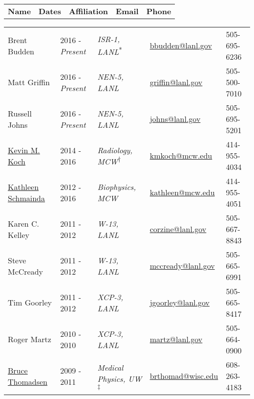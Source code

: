 %


\begin{center}
\begin{minipage}{\textwidth}
\begin{tabular}{p{3.2cm}p{2.2cm}p{3.7cm}p{5.0cm}p{2.4cm}}
\textbf{Name} & \textbf{Dates}  & \textbf{Affiliation} & \textbf{Email} & \textbf{Phone} \\
\end{tabular}
\end{minipage}
\end{center}


\begin{center}
\begin{minipage}{\textwidth}
\begin{tabular}{p{3.2cm}p{2.2cm}p{3.7cm}p{5.0cm}p{2.4cm}}
Brent Budden & 2016 - \emph{Present} & \textit{ISR-1, LANL}\textsuperscript{*} &  \href{mailto:bbudden@lanl.gov}{bbudden@lanl.gov} & 505-695-6236 \\
Matt Griffin & 2016 - \emph{Present} & \textit{NEN-5, LANL}                    &  \href{mailto:griffin@lanl.gov}{griffin@lanl.gov} & 505-500-7010 \\
Russell Johns & 2016 - \emph{Present} & \textit{NEN-5, LANL}                    &  \href{mailto:johns@lanl.gov}{johns@lanl.gov} & 505-695-5201 \\
\href{http://www.mcw.edu/radiology/faculty/Kevin-Koch-PhD.htm}{Kevin M. Koch} & 2014 - 2016 & \textit{Radiology, MCW}\textsuperscript{$\dagger$} & \href{mailto:kmkoch@mcw.edu}{kmkoch@mcw.edu} & 414-955-4034 \\
\href{http://www.mcw.edu/radiology/faculty/Kathleen-Schmainda-PhD.htm}{Kathleen Schmainda} & 2012 - 2016 & \textit{Biophysics, MCW}  & \href{mailto:kathleen@mcw.edu}{kathleen@mcw.edu} &  414-955-4051 \\
Karen C. Kelley & 2011 - 2012 & \textit{W-13, LANL} & \href{mailto:corzine@lanl.gov}{corzine@lanl.gov} & 505-667-8843 \\
Steve McCready & 2011 - 2012 &\textit{W-13, LANL} & \href{mailto:mccready@lanl.gov}{mccready@lanl.gov} & 505-665-6991 \\
Tim Goorley & 2011 - 2012 & \textit{XCP-3, LANL} &\href{mailto:jgoorley@lanl.gov}{jgoorley@lanl.gov} & 505-665-8417 \\
Roger Martz & 2010 - 2010 & \textit{XCP-3, LANL} & \href{mailto:martz@lanl.gov}{martz@lanl.gov} &  505-664-0900 \\
{\href{https://www.medphysics.wisc.edu/directory/thomadsen.php}{Bruce Thomadsen}} \label{bruce_thomadsen}& 2009 - 2011 & \textit{Medical Physics, UW}\textsuperscript{$\ddagger$} & \href{mailto:brthomad@wisc.edu}{brthomad@wisc.edu} &  608-263-4183 \\

\end{tabular}
\end{minipage}
\end{center}

